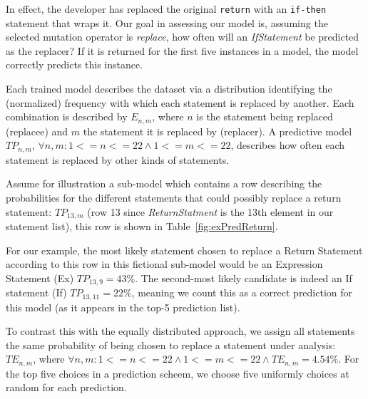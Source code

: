 \documentclass[conference]{IEEEtran}
\begin{document}
In effect, the developer has replaced the original \texttt{return} with an
\texttt{if-then} statement that wraps it.  Our goal in assessing our model is,
assuming the selected mutation operator 
is \emph{replace}, how often will an \emph{IfStatement} be predicted as the
replacer? If it is returned for the first five instances in a model, the model
correctly predicts this instance.  

Each trained model describes the dataset via
a distribution identifying the (normalized) frequency with which each statement is replaced 
by another. Each combination is described by 
$E_{n,m}$, 
where $n$ is the statement being replaced (replacee) and $m$ the statement it is 
replaced by (replacer).  A predictive model $TP_{n,m}$, $\forall n,m: 1<=n<=22 \land 1<=m<=22$, 
describes how often each statement is replaced by 
other kinds of statements. 

Assume for illustration a sub-model which contains a row describing the 
probabilities for the different statements that could possibly replace a return 
statement: $TP_{13,m}$ (row 13 since \emph{ReturnStatment} is the 13th element 
in our statement list), this row is shown in 
Table~\ref{fig:exPredReturn}.

%
For our example, the most
likely statement chosen to replace a Return Statement according to this row in 
this fictional sub-model would be an Expression Statement (Ex) $TP_{13,9} = 43\%$. 
The second-most likely candidate is indeed an If statement (If) $TP_{13,11} = 22\%$,
meaning we count this as a correct prediction for this model (as it appears in
the top-5 prediction list). 

To contrast this with the equally distributed approach,
we assign all statements the same probability of being chosen to replace 
a statement under analysis:
$TE_{n,m}$, where $\forall n,m: 1<=n<=22 \land 1<=m<=22 \land TE_{n,m} = 4.54\%$. 
For the top five choices in a prediction scheem, we choose five uniformly choices at
random for each prediction. 


\end{document}
